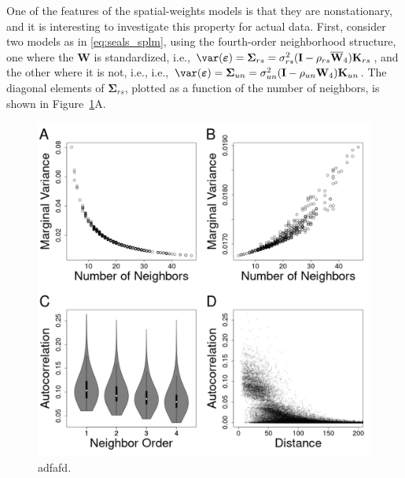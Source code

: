 \documentclass[12pt, titlepage]{article}
\begin{document}
One of the features of the spatial-weights models is that they are nonstationary, and it is interesting to investigate this property for actual data.  First, consider two models as in \eqref{eq:seals_splm}, using the fourth-order neighborhood structure, one where the $\mathbf{W}$ is standardized, i.e., $\var(\boldsymbol{\varepsilon}) = \boldsymbol{\Sigma}_{rs} = \sigma^{2}_{rs}(\mathbf{I} - \rho_{rs}\overline{\mathbf{W}}_{4})\mathbf{K}_{rs}$, and the other where it is not, i.e., i.e., $\var(\boldsymbol{\varepsilon}) = \boldsymbol{\Sigma}_{un} = \sigma^{2}_{un}(\mathbf{I} - \rho_{un}\mathbf{W}_{4})\mathbf{K}_{un}$. The diagonal elements of $\boldsymbol{\Sigma}_{rs}$, plotted as a function of the number of neighbors, is shown in Figure~\ref{Fig:seals_nonstationary}A.
 \begin{figure}[H]
  \begin{center}
	    \includegraphics[width=.8\linewidth]{Seals_nonstationary}
  \end{center}
  \caption{adfafd. \label{Fig:seals_nonstationary}}
\end{figure}
\end{document}
